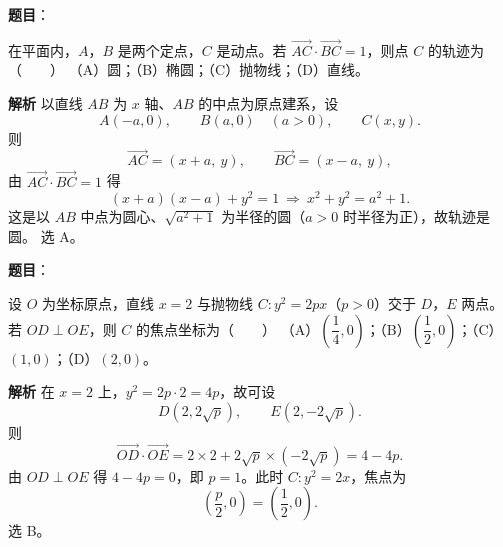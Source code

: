 \begin{answer}

\textbf{题目}：

在平面内，$A$，$B$ 是两个定点，$C$ 是动点。若 $\overrightarrow{AC}\cdot\overrightarrow{BC}=1$，则点 $C$ 的轨迹为\mbox{（　　）}
（A）圆；（B）椭圆；（C）抛物线；（D）直线。

\textbf{解析}
以直线 $AB$ 为 $x$ 轴、$AB$ 的中点为原点建系，设
\nopagebreak[4]
\[A(-a,0),\qquad B(a,0)\quad(a>0),\qquad C(x,y).\]
则
\nopagebreak[4]
\[\overrightarrow{AC}=(x+a,\ y),\qquad \overrightarrow{BC}=(x-a,\ y),\]
由 $\overrightarrow{AC}\cdot\overrightarrow{BC}=1$ 得
\nopagebreak[4]
\[(x+a)(x-a)+y^2=1\ \Longrightarrow\ x^2+y^2=a^2+1 .\]
这是以 $AB$ 中点为圆心、$\sqrt{a^2+1}$ 为半径的圆（$a>0$ 时半径为正），故轨迹是圆。
选 A。


\end{answer}
\begin{answer}

\textbf{题目}：

设 $O$ 为坐标原点，直线 $x=2$ 与抛物线 $C:y^2=2px$（$p>0$）交于 $D$，$E$ 两点。若 $OD\perp OE$，则 $C$ 的焦点坐标为\mbox{（　　）}
（A）$\left(\dfrac14,0\right)$；（B）$\left(\dfrac12,0\right)$；（C）$(1,0)$；（D）$(2,0)$。

\textbf{解析}
在 $x=2$ 上，$y^2=2p\cdot2=4p$，故可设
\nopagebreak[4]
\[D(2,2\sqrt p),\qquad E(2,-2\sqrt p).\]
则
\nopagebreak[4]
\[\overrightarrow{OD}\cdot\overrightarrow{OE}=2\times2+2\sqrt p\times(-2\sqrt p)=4-4p .\]
由 $OD\perp OE$ 得 $4-4p=0$，即 $p=1$。此时 $C:y^2=2x$，焦点为
\nopagebreak[4]
\[\left(\frac p2,0\right)=\left(\frac12,0\right).\]
选 B。


\end{answer}
